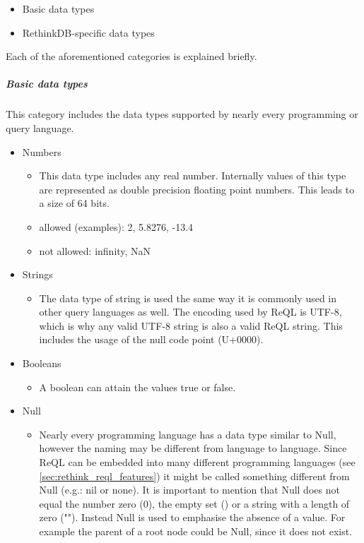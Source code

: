 \begin{itemize}
    \item Basic data types
    \item RethinkDB-specific data types
\end{itemize}

Each of the aforementioned categories is explained briefly.

\subparagraph{Basic data types}
This category includes the data types supported by nearly every programming or query language.

\begin{itemize}
    \item Numbers
    \begin{itemize}
        \item This data type includes any real number. Internally values of this type are represented as double precision floating point numbers. This leads to a size of 64 bits.
        \item allowed (examples): 2, 5.8276, -13.4
        \item not allowed: infinity, NaN
    \end{itemize}
    \item Strings
    \begin{itemize}
        \item The data type of string is used the same way it is commonly used in other query languages as well. The encoding used by ReQL is UTF-8, which is why any valid UTF-8 string is also a valid ReQL string. This includes the usage of the null code point (U+0000).
    \end{itemize}
    \item Booleans
    \begin{itemize}
        \item A boolean can attain the values true or false.
    \end{itemize}
    \item Null
    \begin{itemize}
        \item Nearly every programming language has a data type similar to Null, however the naming may be different from language to language. Since ReQL can be embedded into many different programming languages (see \ref{sec:rethink_reql_features}) it might be called something different from Null (e.g.: nil or none). It is important to mention that Null does not equal the number zero (0), the empty set ({}) or a string with a length of zero (""). Instead Null is used to emphasise the absence of a value. For example the parent of a root node could be Null, since it does not exist.

\end{itemize}
\end{itemize}
